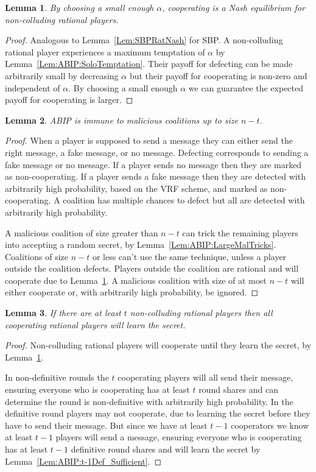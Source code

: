 \documentclass{dalcsthesis}
\newtheorem{lemma}{Lemma}
\begin{document}
\begin{lemma}\label{Lem:ABIP:SoloNash}By choosing a small enough $\alpha$, cooperating is a Nash equilibrium for non-colluding rational players.\end{lemma}
\begin{proof}
Analogous to Lemma~\ref{Lem:SBPRatNash} for SBP. A non-colluding rational player experiences a maximum temptation of $\alpha$ by Lemma~\ref{Lem:ABIP:SoloTemptation}. Their payoff for defecting can be made arbitrarily small by decreasing $\alpha$ but their payoff for cooperating is non-zero and independent of $\alpha$. By choosing a small enough $\alpha$ we can guarantee the expected payoff for cooperating is larger.
\end{proof}

\begin{lemma}\label{Lem:ABIP:SmallMalImmune}ABIP is immune to malicious coalitions up to size $n-t$.\end{lemma}
\begin{proof}
When a player is supposed to send a message they can either send the right message, a fake message, or no message. Defecting corresponds to sending a fake message or no message. If a player sends no message then they are marked as non-cooperating. If a player sends a fake message then they are detected with arbitrarily high probability, based on the VRF scheme, and marked as non-cooperating. A coalition has multiple chances to defect but all are detected with arbitrarily high probability.

A malicious coalition of size greater than $n-t$ can trick the remaining players into accepting a random secret, by Lemma~\ref{Lem:ABIP:LargeMalTricks}. Coalitions of size $n-t$ or less can't use the same technique, unless a player outside the coalition defects. Players outside the coalition are rational and will cooperate due to Lemma~\ref{Lem:ABIP:SoloNash}. A malicious coalition with size of at most $n-t$ will either cooperate or, with arbitrarily high probability, be ignored.
\end{proof}

\begin{lemma}\label{Lem:ABIP:WorksForEnoughSoloRats}If there are at least $t$ non-colluding rational players then all cooperating rational players will learn the secret.\end{lemma}
\begin{proof}
Non-colluding rational players will cooperate until they learn the secret, by Lemma~\ref{Lem:ABIP:SoloNash}.

In non-definitive rounds the $t$ cooperating players will all send their message, ensuring everyone who is cooperating has at least $t$ round shares and can determine the round is non-definitive with arbitrarily high probability. In the definitive round players may not cooperate, due to learning the secret before they have to send their message. But since we have at least $t-1$ cooperators we know at least $t-1$ players will send a message, ensuring everyone who is cooperating has at least $t-1$ definitive round shares and will learn the secret by Lemma~\ref{Lem:ABIP:t-1Def_Sufficient}. 
\end{proof}
\end{document}
